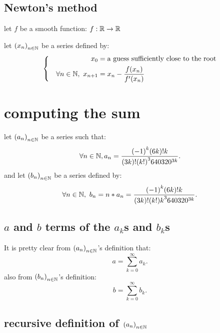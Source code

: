 \documentclass[fleqn]{report}
\begin{document}
\section{Newton's method}
let $ f$ be a smooth function: $ f : \mathbb R \to \mathbb R$

\noindent
let $ {(x_n)}_{n \in \mathbb N}$ be a series defined by:
\begin{align*}
  \left\{
  \begin{aligned}
    x_0                                & = \text{a guess sufficiently close to the root} \\
    \quad \forall n \in \mathbb N,\ x_{n + 1} & = x_n - \frac{f(x_n)}{f'(x_n)}
  \end{aligned}
  \right.
\end{align*}

\chapter{computing the sum}

let ${(a_n)}_{n \in \mathbb N}$ be a series such that:
\[
  \forall n \in \mathbb N, a_n = \frac{{(-1)}^k(6k)!k}{(3k)!{(k!)}^{3}640320^{3k}}
  .\]
and let ${(b_n)}_{n \in \mathbb N}$ be a series defined by:
\[
  \forall n  \in \mathbb N,\ b_n = n * a_n = \frac{{(-1)}^k(6k)!k}{(3k)!{(k!)k}^{3}640320^{3k}}
  .\]

\section{$a$ and  $ b$  terms of the $a_k$s and $b_k$s}
It is pretty clear from $ {(a_n)}_{n \in \mathbb N}$'s definition that:
\[
  a = \sum_{k=0}^{\infty} a_k
  .\]
also from $ {(b_n)}_{n \in \mathbb N}$'s definition:
\[
  b = \sum_{k=0}^{\infty} b_k
  .\]

\section{recursive definition of ${(a_n)}_{n \in \mathbb N}$}
\end{document}
